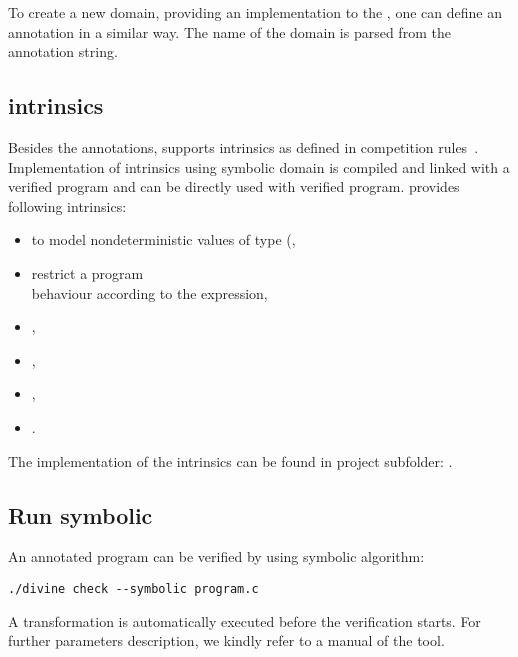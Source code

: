 To create a new domain, providing an implementation to the \LART, one can define
an annotation in a similar way. The name of the domain is parsed from the
annotation string.

\subsection{\svcomp intrinsics}
Besides the annotations, \DIVINE supports \svcomp intrinsics as defined in
competition rules~\cite{svcomp}. Implementation of intrinsics using symbolic
domain is compiled and linked with a verified program and can be directly used
with verified program. \DIVINE provides following intrinsics:
\begin{itemize}
\item {} to model nondeterministic values of
type  (,
\item {} restrict a program \\behaviour
    according to the expression,
\item {},
\item {},
\item {},
\item {}.
\end{itemize}
The implementation of the intrinsics can be found in \DIVINE project subfolder:
.

\subsection{Run symbolic \DIVINE}

An annotated program can be verified by \DIVINE using symbolic algorithm:
\begin{verbatim}
./divine check --symbolic program.c
\end{verbatim}
A transformation is automatically executed before the verification starts. For
further parameters description, we kindly refer to a manual of the tool.

